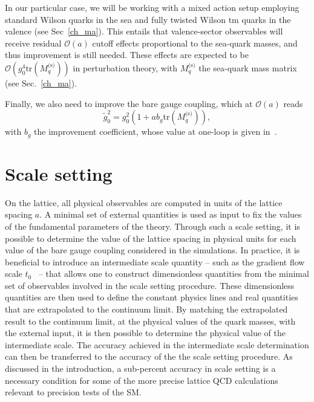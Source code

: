 In our particular case, we will be working with a mixed action setup employing standard Wilson quarks in the sea and fully twisted Wilson tm quarks in the valence (see Sec~\ref{ch_ma}). This entails that valence-sector observables will receive residual $\mathcal{O}(a)$ cutoff effects proportional to the sea-quark masses, and thus improvement is still needed. These effects are expected to be $\mathcal{O}\left(g_0^4{\textrm{tr}}\left(M_q^{\textrm{(s)}}\right)\right)$ in perturbation theory, with $M_q^{\textrm{(s)}}$ the sea-quark mass matrix (see Sec.~\ref{ch_ma}).

Finally, we also need to improve the bare gauge coupling, which at $\mathcal{O}(a)$ reads
\begin{equation}
\tilde{g}_0^2=g_0^2\left(1+ab_g{\textrm{tr}}\left(M_q^{\textrm{(s)}}\right)\right),
\end{equation}
with $b_g$ the improvement coefficient, whose value at one-loop is given in~\citep{Luscher:1996sc}.


\section{Scale setting}
\label{ch_foundation:sec:ss}

On the lattice, all physical observables are computed in units of the lattice spacing $a$. A minimal set of external quantities is used as input to fix the values of the fundamental parameters of the theory. Through such a scale setting, it is possible to determine the value of the lattice spacing in physical units for each value of the bare gauge coupling considered in the simulations. In practice, it is beneficial to introduce an intermediate scale quantity -- such as the gradient flow scale $t_0$~\citep{Luscher:2010we,1006.4518} -- that allows one to construct dimensionless quantities from the minimal set of observables involved in the scale setting procedure. These dimensionless quantities are then used to define the constant physics lines and real quantities that are extrapolated to the continuum limit. By matching the extrapolated result to the continuum limit, at the physical values of the quark masses, with the external input, it is then possible to determine the physical value of the intermediate scale. The accuracy achieved in the intermediate scale determination can then be transferred to the accuracy of the the scale setting procedure. As discussed in the introduction, a sub-percent accuracy in scale setting is a necessary condition for some of the more precise lattice QCD calculations relevant to precision tests of the SM. 

